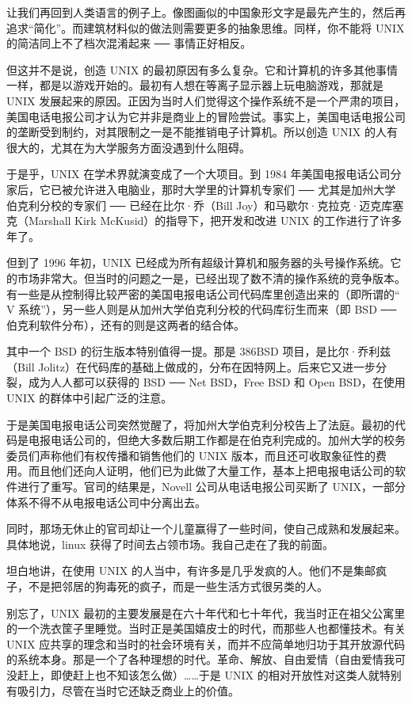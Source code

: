 让我们再回到人类语言的例子上。像图画似的中国象形文字是最先产生的，然后再追求“简化”。而建筑材料似的做法则需要更多的抽象思维。同样，你不能将 UNIX 的简洁同上不了档次混淆起来 ── 事情正好相反。

但这并不是说，创造 UNIX 的最初原因有多么复杂。它和计算机的许多其他事情一样，都是以游戏开始的。最初有人想在等离子显示器上玩电脑游戏，那就是 UNIX 发展起来的原因。正因为当时人们觉得这个操作系统不是一个严肃的项目，美国电话电报公司才认为它并非是商业上的冒险尝试。事实上，美国电话电报公司的垄断受到制约，对其限制之一是不能推销电子计算机。所以创造 UNIX 的人有很大的，尤其在为大学服务方面没遇到什么阻碍。

于是乎，UNIX 在学术界就演变成了一个大项目。到 1984 年美国电报电话公司分家后，它已被允许进入电脑业，那时大学里的计算机专家们 ── 尤其是加州大学伯克利分校的专家们 ── 已经在比尔·乔（Bill Joy）和马歇尔·克拉克·迈克库塞克（Marshall Kirk McKusid）的指导下，把开发和改进 UNIX 的工作进行了许多年了。

但到了 1996 年初，UNIX 已经成为所有超级计算机和服务器的头号操作系统。它的市场非常大。但当时的问题之一是，已经出现了数不清的操作系统的竞争版本。有一些是从控制得比较严密的美国电报电话公司代码库里创造出来的（即所谓的“ V 系统”），另一些人则是从加州大学伯克利分校的代码库衍生而来（即 BSD ── 伯克利软件分布），还有的则是这两者的结合体。

其中一个 BSD 的衍生版本特别值得一提。那是 386BSD 项目，是比尔·乔利兹（Bill Jolitz）在代码库的基础上做成的，分布在因特网上。后来它又进一步分裂，成为人人都可以获得的 BSD ── Net BSD，Free BSD 和 Open BSD，在使用 UNIX 的群体中引起广泛的注意。

于是美国电报电话公司突然觉醒了，将加州大学伯克利分校告上了法庭。最初的代码是电报电话公司的，但绝大多数后期工作都是在伯克利完成的。加州大学的校务委员们声称他们有权传播和销售他们的 UNIX 版本，而且还可收取象征性的费用。而且他们还向人证明，他们已为此做了大量工作，基本上把电报电话公司的软件进行了重写。官司的结果是，Novell 公司从电话电报公司买断了 UNIX，一部分体系不得不从电报电话公司中分离出去。

同时，那场无休止的官司却让一个儿童赢得了一些时间，使自己成熟和发展起来。具体地说，linux 获得了时间去占领市场。我自己走在了我的前面。

坦白地讲，在使用 UNIX 的人当中，有许多是几乎发疯的人。他们不是集邮疯子，不是把邻居的狗毒死的疯子，而是一些生活方式很另类的人。

别忘了，UNIX 最初的主要发展是在六十年代和七十年代，我当时正在祖父公寓里的一个洗衣筐子里睡觉。当时正是美国嬉皮士的时代，而那些人也都懂技术。有关 UNIX 应共享的理念和当时的社会环境有关，而并不应简单地归功于其开放源代码的系统本身。那是一个了各种理想的时代。革命、解放、自由爱情（自由爱情我可没赶上，即使赶上也不知该怎么做）……于是 UNIX 的相对开放性对这类人就特别有吸引力，尽管在当时它还缺乏商业上的价值。

